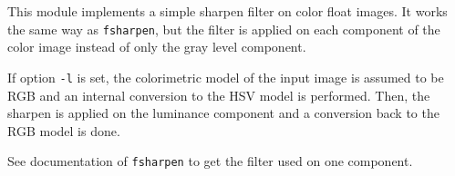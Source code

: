 This module implements a simple sharpen filter 
on color float images.
It works the same way as {\tt fsharpen}, but the filter is applied
on each component of the color image instead of only the gray level 
component. 

If option {\tt -l} is set, the colorimetric model of the input image is 
assumed to be RGB and an internal conversion to the HSV model is performed.
Then, the sharpen is applied on the luminance component and a conversion
back to the RGB model is done.
 
See documentation of {\tt fsharpen} to get the filter used on one component.




